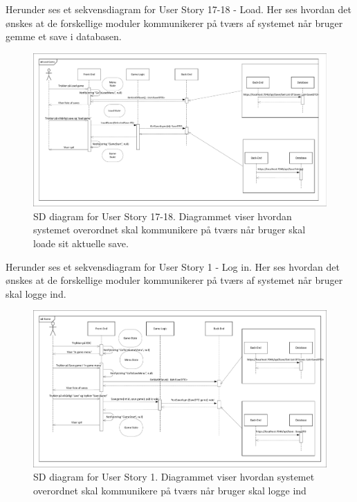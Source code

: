\noindent Herunder ses et sekvensdiagram for User Story 17-18 - Load. Her ses hvordan det ønskes at de forskellige moduler kommunikerer på tværs af systemet når bruger gemme et save i databasen.
\begin{figure}[H]
\centering
\includegraphics[width = \textwidth]{02-Body/Images/Arkitektur - SD Load Game}
\caption{SD diagram for User Story 17-18. Diagrammet viser hvordan systemet overordnet skal kommunikere på tværs når bruger skal loade sit aktuelle save. }
\label{fig:Arkitektur-SD-LoadGame}
\end{figure}

\noindent Herunder ses et sekvensdiagram for User Story 1 - Log in. Her ses hvordan det ønskes at de forskellige moduler kommunikerer på tværs af systemet når bruger skal logge ind.
\begin{figure}[H]
\centering
\includegraphics[width = \textwidth]{02-Body/Images/Arkitektur - SD Login}
\caption{SD diagram for User Story 1. Diagrammet viser hvordan systemet overordnet skal kommunikere på tværs når bruger skal logge ind}
\label{fig:Arkitektur-SD-Login}
\end{figure}


